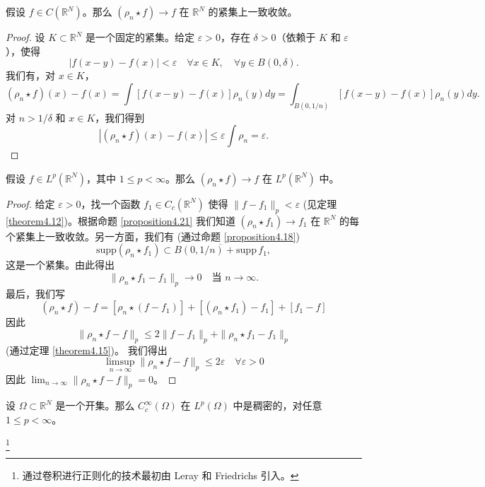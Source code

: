 \begin{proposition}\label{proposition4.21}
假设 $f \in C(\mathbb{R}^N)$。那么 $(\rho_n \star f) \to f$ 在 $\mathbb{R}^N$ 的紧集上一致收敛。
\end{proposition}

\begin{proof}
设 $K \subset \mathbb{R}^N$ 是一个固定的紧集。给定 $\varepsilon > 0$，存在 $\delta > 0$（依赖于 $K$ 和 $\varepsilon$），使得
\[ |f(x-y)-f(x)| < \varepsilon \quad \forall x \in K, \quad \forall y \in B(0, \delta). \]
我们有，对 $x \in K$，
\[ (\rho_n \star f)(x) - f(x) = \int [f(x-y)-f(x)] \rho_n(y) dy = \int_{B(0,1/n)} [f(x-y)-f(x)] \rho_n(y) dy. \]
对 $n > 1/\delta$ 和 $x \in K$，我们得到
\[ |(\rho_n \star f)(x) - f(x)| \le \varepsilon \int \rho_n = \varepsilon. \]
\end{proof}

\begin{theorem}\label{theorem4.22}
假设 $f \in L^p(\mathbb{R}^N)$，其中 $1 \le p < \infty$。那么 $(\rho_n \star f) \to f$ 在 $L^p(\mathbb{R}^N)$ 中。
\end{theorem}
\begin{proof}
给定 $\varepsilon > 0$，找一个函数 $f_1 \in C_c(\mathbb{R}^N)$ 使得 $\|f - f_1\|_p < \varepsilon$ (见定理 \ref{theorem4.12})。根据命题 \ref{proposition4.21} 我们知道 $(\rho_n \star f_1) \to f_1$ 在 $\mathbb{R}^N$ 的每个紧集上一致收敛。另一方面，我们有 (通过命题 \ref{proposition4.18})
\[ \mathrm{supp}(\rho_n \star f_1) \subset \overline{B(0, 1/n) + \mathrm{supp}\,f_1}, \]
这是一个紧集。由此得出
\[ \|\rho_n \star f_1 - f_1\|_p \to 0 \quad \text{当 } n \to \infty. \]
最后，我们写
\[ (\rho_n \star f) - f = [\rho_n \star (f - f_1)] + [(\rho_n \star f_1) - f_1] + [f_1 - f] \]
因此
\[ \|\rho_n \star f - f\|_p \le 2\|f-f_1\|_p + \|\rho_n \star f_1 - f_1\|_p \]
(通过定理 \ref{theorem4.15})。
我们得出
\[ \limsup_{n\to\infty} \|\rho_n \star f - f\|_p \le 2\varepsilon \quad \forall \varepsilon > 0 \]
因此 $\lim_{n\to\infty} \|\rho_n \star f - f\|_p = 0$。
\end{proof}

\begin{corollary}\label{corollary4.23}
设 $\Omega \subset \mathbb{R}^N$ 是一个开集。那么 $C_c^\infty(\Omega)$ 在 $L^p(\Omega)$ 中是稠密的，对任意 $1 \le p < \infty$。
\end{corollary}
\footnote{通过卷积进行正则化的技术最初由 Leray 和 Friedrichs 引入。}

